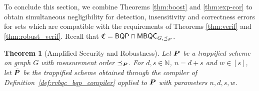 \documentclass[12pt]{iopart}
\renewcommand{\1}{\mathds{1}}
\newtheorem{theorem}{Theorem}
\begin{document}
To conclude this section, we combine Theorems \ref{thm:boost} and
\ref{thm:exp-cor} to obtain simultaneous negligibility for detection,
insensitivity and correctness errors
for sets which are compatible with the requirements of Theorems \ref{thm:verif} and \ref{thm:robust_verif}.
Recall that $\mathfrak{C} = \mathsf{BQP} \cap \mathsf{MBQC}_{G, \preceq_{\bm{P}}}$.

\begin{theorem}[Amplified Security and Robustness]
\label{thm:comb}
  Let $\bm{P}$ be a trappified scheme on graph $G$ with measurement order $\preceq_{\bm{P}}$.
  For $d, s \in \mathbb{N}$, $n = d + s$ and $w \in [s]$, let $\tilde{\bm{P}}$ be the trappified scheme obtained through the compiler of Definition~\ref{def:rvbqc_bqp_compiler} applied to $\bm{P}$ with parameters $n, d, s, w$.
  

\end{theorem}
\end{document}
